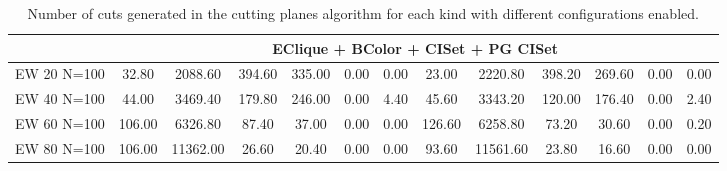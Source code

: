 \begin{sidewaystable}[h]
\begin{tabular}{|c|cccccc|cccccc|}
\hline 
\multicolumn{1}{|c|}{} & \multicolumn{12}{|c|}{EClique + BColor + CISet + PG CISet} \\
\hline
EW 20 N=100 & 32.80 & 2088.60 & 394.60 & 335.00 & 0.00 & 0.00 & 23.00 & 2220.80 & 398.20 & 269.60 & 0.00 & 0.00
\\
EW 40 N=100 & 44.00 & 3469.40 & 179.80 & 246.00 & 0.00 & 4.40 & 45.60 & 3343.20 & 120.00 & 176.40 & 0.00 & 2.40
\\
EW 60 N=100 & 106.00 & 6326.80 & 87.40 & 37.00 & 0.00 & 0.00 & 126.60 & 6258.80 & 73.20 & 30.60 & 0.00 & 0.20
\\
EW 80 N=100 & 106.00 & 11362.00 & 26.60 & 20.40 & 0.00 & 0.00 & 93.60 & 11561.60 & 23.80 & 16.60 & 0.00 & 0.00
\\
\hline
 \end{tabular}

\caption{Number of cuts generated in the cutting planes algorithm for each kind with different configurations enabled.}	
\label{table:cuts:counts}

\end{sidewaystable}